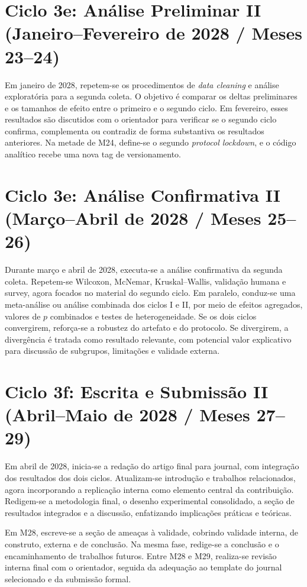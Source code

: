 \documentclass[12pt,a4paper]{article}
\begin{document}
\section*{Ciclo 3e: Análise Preliminar II (Janeiro--Fevereiro de 2028 / Meses 23--24)}

Em janeiro de 2028, repetem-se os procedimentos de \textit{data cleaning} e análise exploratória para a segunda coleta. O objetivo é comparar os deltas preliminares e os tamanhos de efeito entre o primeiro e o segundo ciclo. Em fevereiro, esses resultados são discutidos com o orientador para verificar se o segundo ciclo confirma, complementa ou contradiz de forma substantiva os resultados anteriores. Na metade de M24, define-se o segundo \textit{protocol lockdown}, e o código analítico recebe uma nova tag de versionamento.

\section*{Ciclo 3e: Análise Confirmativa II (Março--Abril de 2028 / Meses 25--26)}

Durante março e abril de 2028, executa-se a análise confirmativa da segunda coleta. Repetem-se Wilcoxon, McNemar, Kruskal--Wallis, validação humana e survey, agora focados no material do segundo ciclo. Em paralelo, conduz-se uma meta-análise ou análise combinada dos ciclos I e II, por meio de efeitos agregados, valores de $p$ combinados e testes de heterogeneidade. Se os dois ciclos convergirem, reforça-se a robustez do artefato e do protocolo. Se divergirem, a divergência é tratada como resultado relevante, com potencial valor explicativo para discussão de subgrupos, limitações e validade externa.

\section*{Ciclo 3f: Escrita e Submissão II (Abril--Maio de 2028 / Meses 27--29)}

Em abril de 2028, inicia-se a redação do artigo final para journal, com integração dos resultados dos dois ciclos. Atualizam-se introdução e trabalhos relacionados, agora incorporando a replicação interna como elemento central da contribuição. Redigem-se a metodologia final, o desenho experimental consolidado, a seção de resultados integrados e a discussão, enfatizando implicações práticas e teóricas.

Em M28, escreve-se a seção de ameaças à validade, cobrindo validade interna, de construto, externa e de conclusão. Na mesma fase, redige-se a conclusão e o encaminhamento de trabalhos futuros. Entre M28 e M29, realiza-se revisão interna final com o orientador, seguida da adequação ao template do journal selecionado e da submissão formal.
\end{document}
